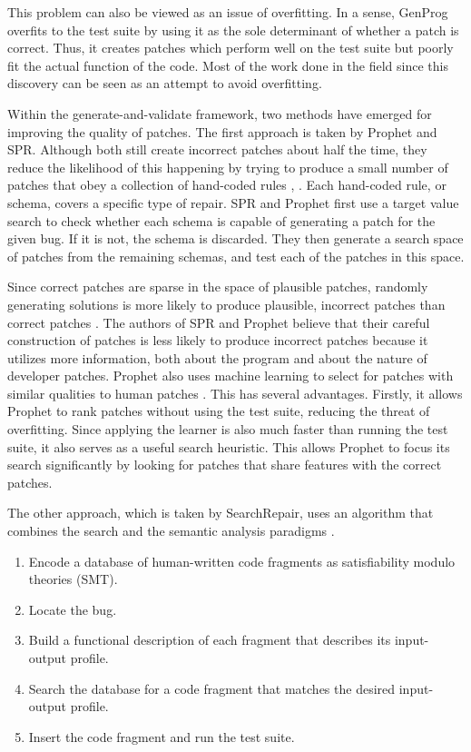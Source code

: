 \documentclass[conference]{IEEEtran}
\begin{document}
This problem can also be viewed as an issue of overfitting. 
In a sense, GenProg overfits to the test suite by using it as the sole determinant of whether a patch is correct. 
Thus, it creates patches which perform well on the test suite but poorly fit the actual function of the code. 
Most of the work done in the field since this discovery can be seen as an attempt to avoid overfitting.

Within the generate-and-validate framework, two methods have emerged for improving the quality of patches. 
The first approach is taken by Prophet and SPR. Although both still create incorrect patches about half the time, they reduce the likelihood of this happening by trying to produce a small number of patches that obey a collection of hand-coded rules \cite{SPR}, \cite{Prophet}. 
Each hand-coded rule, or schema, covers a specific type of repair. SPR and Prophet first use a target value search to check whether each schema is capable of generating a patch for the given bug. 
If it is not, the schema is discarded. 
They then generate a search space of patches from the remaining schemas, and test each of the patches in this space.

Since correct patches are sparse in the space of plausible patches, randomly generating solutions is more likely to produce plausible, incorrect patches than correct patches \cite{searchspace}.  
The authors of SPR and Prophet believe that their careful construction of patches is less likely to produce incorrect patches because it utilizes more information, both about the program and about the nature of developer patches.  
Prophet also uses machine learning to select for patches with similar qualities to human patches \cite{Prophet}. 
This has several advantages. 
Firstly, it allows Prophet to rank patches without using the test suite, reducing the threat of overfitting. 
Since applying the learner is also much faster than running the test suite, it also serves as a useful search heuristic. 
This allows Prophet to focus its search significantly by looking for patches that share features with the correct patches. 

The other approach, which is taken by SearchRepair, uses an algorithm that combines the search and the semantic analysis paradigms \cite{SearchRepair}. 
\begin{enumerate}
\item Encode a database of human-written code fragments as satisfiability modulo theories (SMT).
\item Locate the bug.
\item Build a functional description of each fragment that describes its input-output profile.
\item Search the database for a code fragment that matches the desired input-output profile.
\item Insert the code fragment and run the test suite.
\end{enumerate}
\end{document}
